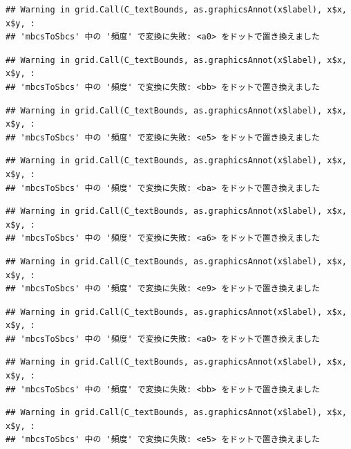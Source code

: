 \documentclass[
]{book}
\begin{document}
\begin{verbatim}
## Warning in grid.Call(C_textBounds, as.graphicsAnnot(x$label), x$x, x$y, :
## 'mbcsToSbcs' 中の '頻度' で変換に失敗: <a0> をドットで置き換えました
\end{verbatim}

\begin{verbatim}
## Warning in grid.Call(C_textBounds, as.graphicsAnnot(x$label), x$x, x$y, :
## 'mbcsToSbcs' 中の '頻度' で変換に失敗: <bb> をドットで置き換えました
\end{verbatim}

\begin{verbatim}
## Warning in grid.Call(C_textBounds, as.graphicsAnnot(x$label), x$x, x$y, :
## 'mbcsToSbcs' 中の '頻度' で変換に失敗: <e5> をドットで置き換えました
\end{verbatim}

\begin{verbatim}
## Warning in grid.Call(C_textBounds, as.graphicsAnnot(x$label), x$x, x$y, :
## 'mbcsToSbcs' 中の '頻度' で変換に失敗: <ba> をドットで置き換えました
\end{verbatim}

\begin{verbatim}
## Warning in grid.Call(C_textBounds, as.graphicsAnnot(x$label), x$x, x$y, :
## 'mbcsToSbcs' 中の '頻度' で変換に失敗: <a6> をドットで置き換えました
\end{verbatim}

\begin{verbatim}
## Warning in grid.Call(C_textBounds, as.graphicsAnnot(x$label), x$x, x$y, :
## 'mbcsToSbcs' 中の '頻度' で変換に失敗: <e9> をドットで置き換えました
\end{verbatim}

\begin{verbatim}
## Warning in grid.Call(C_textBounds, as.graphicsAnnot(x$label), x$x, x$y, :
## 'mbcsToSbcs' 中の '頻度' で変換に失敗: <a0> をドットで置き換えました
\end{verbatim}

\begin{verbatim}
## Warning in grid.Call(C_textBounds, as.graphicsAnnot(x$label), x$x, x$y, :
## 'mbcsToSbcs' 中の '頻度' で変換に失敗: <bb> をドットで置き換えました
\end{verbatim}

\begin{verbatim}
## Warning in grid.Call(C_textBounds, as.graphicsAnnot(x$label), x$x, x$y, :
## 'mbcsToSbcs' 中の '頻度' で変換に失敗: <e5> をドットで置き換えました
\end{verbatim}
\end{document}
